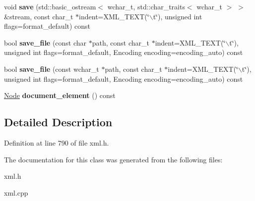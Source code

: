 \begin{DoxyCompactItemize}
\item 
\hypertarget{classphys_1_1xml_1_1Document_a8bdba6317f7ba369c3c83f2e3f77829a}{
void {\bfseries save} (std::basic\_\-ostream$<$ wchar\_\-t, std::char\_\-traits$<$ wchar\_\-t $>$ $>$ \&stream, const char\_\-t $\ast$indent=XML\_\-TEXT(\char`\"{}$\backslash$t\char`\"{}), unsigned int flags=format\_\-default) const }
\label{dd/d44/classphys_1_1xml_1_1Document_a8bdba6317f7ba369c3c83f2e3f77829a}

\item 
\hypertarget{classphys_1_1xml_1_1Document_ac6eebad9e56a83536fac58d35b49b2e1}{
bool {\bfseries save\_\-file} (const char $\ast$path, const char\_\-t $\ast$indent=XML\_\-TEXT(\char`\"{}$\backslash$t\char`\"{}), unsigned int flags=format\_\-default, Encoding encoding=encoding\_\-auto) const }
\label{dd/d44/classphys_1_1xml_1_1Document_ac6eebad9e56a83536fac58d35b49b2e1}

\item 
\hypertarget{classphys_1_1xml_1_1Document_a67a9fc41324ad4a06f53501eb5b74528}{
bool {\bfseries save\_\-file} (const wchar\_\-t $\ast$path, const char\_\-t $\ast$indent=XML\_\-TEXT(\char`\"{}$\backslash$t\char`\"{}), unsigned int flags=format\_\-default, Encoding encoding=encoding\_\-auto) const }
\label{dd/d44/classphys_1_1xml_1_1Document_a67a9fc41324ad4a06f53501eb5b74528}

\item 
\hypertarget{classphys_1_1xml_1_1Document_a481cbf277cfe6d6daf1b66f8d862b88e}{
\hyperlink{classphys_1_1xml_1_1Node}{Node} {\bfseries document\_\-element} () const }
\label{dd/d44/classphys_1_1xml_1_1Document_a481cbf277cfe6d6daf1b66f8d862b88e}

\end{DoxyCompactItemize}


\subsection{Detailed Description}


Definition at line 790 of file xml.h.



The documentation for this class was generated from the following files:\begin{DoxyCompactItemize}
\item 
xml.h\item 
xml.cpp\end{DoxyCompactItemize}
